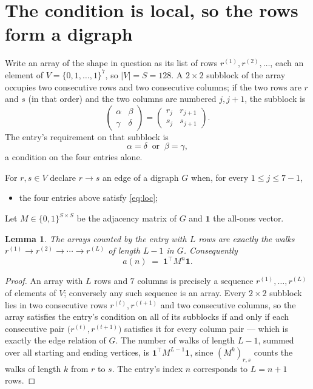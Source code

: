 \documentclass[11pt,a4paper]{article}
\theoremstyle{plain}
\newtheorem{lemma}[theorem]{Lemma}
\theoremstyle{definition}
\begin{document}
\section{The condition is local, so the rows form a digraph}

Write an array of the shape in question as its list of rows
$r^{(1)},r^{(2)},\dots$, each an element of
$V=\{0,1,\dots,1\}^{7}$, so $|V|=S=128$. A $2\times2$ subblock of the array
occupies two consecutive rows and two consecutive columns; if the two rows are $r$
and $s$ (in that order) and the two columns are numbered $j,j+1$,
the subblock is
\[
\begin{pmatrix}\alpha&\beta\\\gamma&\delta\end{pmatrix}=\begin{pmatrix}r_j&r_{j+1}\\s_j&s_{j+1}\end{pmatrix}.
\]
The entry's requirement on that subblock is
\begin{equation}\label{eq:loc}
\alpha=\delta\ \text{ or }\ \beta=\gamma,
\end{equation}
a condition on the four entries alone.

For $r,s\in V$ declare $r\to s$ an edge of a digraph $G$ when, for every
$1\le j\le 7-1$,
\begin{itemize}
\item the four entries above satisfy \eqref{eq:loc};

\end{itemize}
Let $M\in\{0,1\}^{S\times S}$ be the adjacency matrix of $G$ and $\mathbf{1}$ the
all-ones vector.

\begin{lemma}\label{lem:walk}
The arrays counted by the entry with $L$ rows are exactly the walks
$r^{(1)}\to r^{(2)}\to\cdots\to r^{(L)}$ of length $L-1$ in $G$. Consequently
\[
a(n)\;=\;\mathbf{1}^{\!\top}M^{n}\mathbf{1} .
\]
\end{lemma}

\begin{proof}
An array with $L$ rows and $7$ columns is precisely a sequence
$r^{(1)},\dots,r^{(L)}$ of elements of $V$; conversely any such sequence is an array.
Every $2\times2$ subblock lies in two consecutive rows $r^{(t)},r^{(t+1)}$ and two
consecutive columns, so the array satisfies the entry's condition on all of its subblocks
if and only if each consecutive pair $\bigl(r^{(t)},r^{(t+1)}\bigr)$ satisfies it for
every column pair --- which is exactly the edge relation of $G$. The number of walks of
length $L-1$, summed over all starting and ending vertices, is
$\mathbf{1}^{\!\top}M^{L-1}\mathbf{1}$, since $(M^{k})_{r,s}$ counts the walks of
length $k$ from $r$ to $s$. The entry's index $n$ corresponds to $L=n+1$ rows.
\end{proof}
\end{document}
